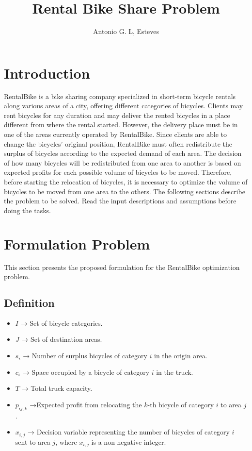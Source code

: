 \documentclass[]{article}
\title{Rental Bike Share Problem}
\author{Antonio G. L, Esteves}
\begin{document}
\maketitle

\section{Introduction}
 
RentalBike is a bike sharing company specialized in short-term bicycle rentals along various areas of a city, offering different categories of bicycles. Clients may rent bicycles for any duration and may deliver the rented bicycles in a place different from where the rental started. However, the delivery place must be in one of the areas currently operated by RentalBike. Since clients are able to change the bicycles’ original position, RentalBike must often redistribute the surplus of bicycles according to the expected demand of each area. 
The decision of how many bicycles will be redistributed from one area to another is based on expected profits for each possible volume of bicycles to be moved. Therefore, before starting the relocation of bicycles, it is necessary to optimize the volume of bicycles to be moved from one area to the others. 
The following sections describe the problem to be solved. Read the input descriptions and assumptions before doing the tasks. 


\section{Formulation Problem}

This section presents the proposed formulation for the RentalBike optimization problem.

\subsection{Definition}

\begin{itemize}
	\item $I$ → Set of bicycle categories.
	\item $J$ → Set of destination areas.
	\item $s_i$ → Number of surplus bicycles of category $i$ in the origin area.
	\item $c_i$ → Space occupied by a bicycle of category $i$ in the truck.
	\item $T$ → Total truck capacity.
	\item $p_{ij,k}$ →Expected profit from relocating the $k$-th bicycle of category $i$ to area $j$.
	\item $x_{i,j}$ → Decision variable representing the number of bicycles of category $i$ sent to area $j$, where $x_{i,j}$ is a non-negative integer.
\end{itemize}
\end{document}
